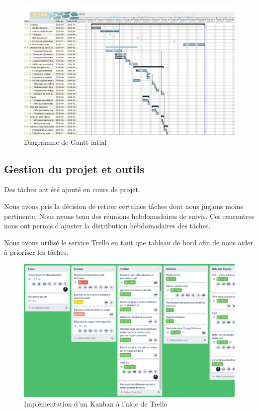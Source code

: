 \begin{figure}[h!]
    \centering
    \includegraphics[width=\linewidth]{img/s1/robuck-2019-09-26}
    \caption{Diagramme de Gantt intial}
    \label{fig:planif-initial}
\end{figure}


\subsection{Gestion du projet et outils}


Des tâches ont été ajouté en cours de projet.

Nous avons pris la décision de retirer certaines tâches dont nous jugions moins pertinente.
Nous avons tenu des réunions hebdomadaires de suivis.
Ces rencontres nous ont permis d'ajuster la distribution hebdomadaires des tâches.

Nous avons utilisé le service Trello en tant que tableau de bord afin de nous aider à prioriser les tâches.

\begin{figure}[h!]
    \centering
    \includegraphics[width=\linewidth]{img/s1/trello}
    \caption{Implémentation d'un Kanban à l'aide de Trello}
    \label{fig:planif-trello}
\end{figure}
